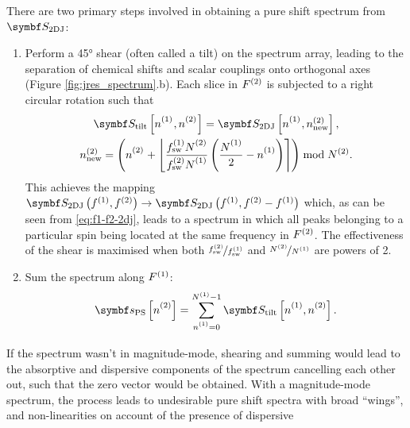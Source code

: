 There are two primary steps involved in obtaining a
pure shift spectrum from $\jresspec$:
\begin{enumerate}
    \item Perform a \ang{45} shear (often called a tilt) on the spectrum array,
        leading to the separation of chemical shifts and scalar couplings onto
        orthogonal axes  (Figure \ref{fig:jres_spectrum}.b). Each
        slice in $F^{(2)}$ is subjected to a right circular rotation such that
        \begin{subequations}
            \begin{gather}
                \jresspectilt\left[{\none}\vpsub{\mathrm{sw}},{\ntwo}\vpsub{\mathrm{sw}}\right] =
                \jresspec\left[{\none}\vpsub{\mathrm{sw}},\ntwonew\right],\\
                \ntwonew = \left(
                    {\ntwo}\vpsub{\mathrm{new}} + \left\lfloor
                        \frac
                            {\fswone \Ntwo\vpsub{\mathrm{sw}}}
                            {\fswtwo \None\vpsub{\mathrm{sw}}}
                        \left(
                            \frac{\None\vpsub{\mathrm{sw}}}{2} - \none
                        \right)
                    \right\rceil
                \right) \bmod \Ntwo.
            \end{gather}
        \end{subequations}
        This achieves the mapping $\jresspec\left(\fone,\ftwo\right)
        \rightarrow \jresspec\left(\fone, \ftwo - \fone\right)$ which, as can
        be seen from \eqref{eq:f1-f2-2dj}, leads to a spectrum in which all
        peaks belonging to a particular spin being located at the same
        frequency in $F^{(2)}$.  The effectiveness of the shear is maximised when
        both $\nicefrac{f_{\mathrm{sw}}^{(2)}}{f_{\mathrm{sw}}^{(1)}}$ and $\nicefrac{N^{(2)}}{N^{(1)}}$ are
        powers of 2.
    \item Sum the spectrum along $F^{(1)}$:
        \begin{equation}
            \specps\idxntwo =
            \sum_{\none=0}^{\None-1} \jresspectilt\idxnonentwo.
        \end{equation}
\end{enumerate}%
If the spectrum wasn't in magnitude-mode, shearing and summing would lead to
the absorptive and dispersive components of the spectrum cancelling each other
out, such that the zero vector would be obtained.
With a magnitude-mode spectrum, the process leads to undesirable pure shift
spectra with broad ``wings'', and non-linearities on account of the presence of dispersive
